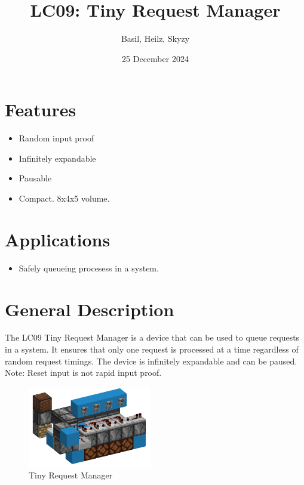 \documentclass[10pt]{datasheet}
\title{LC09: Tiny Request Manager}
\author{Basil, Heilz, Skyzy}
\date{25 December 2024}
\begin{document}
\maketitle

\section{Features}

\begin{itemize}
\item{Random input proof}
\item{Infinitely expandable}
\item{Pausable}
\item{Compact. 8x4x5 volume.}
\end{itemize}

\section{Applications}

\begin{itemize}
\item{Safely queueing procesess in a system.}
\end{itemize}

\section{General Description}
The LC09 Tiny Request Manager is a device that can be used to queue requests in a system. It ensures that only one request is processed at a time regardless of random request timings. The device is infinitely expandable and can be paused. Note: Reset input is not rapid input proof.

\vfill\break

\begin{figure}[H]
    \centering
    \includegraphics[width=0.48\textwidth]{pic.png}
    \caption{\centering Tiny Request Manager}
\end{figure}

\onecolumn
\end{document}
